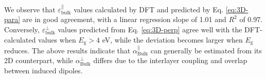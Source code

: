 \documentclass[journal=ancac3,manuscript=article,email=true,hyperref=true,keywords=false]{achemso}
\begin{document}
%
We observe that
$\varepsilon_{\mathrm{bulk}}^{\parallel}$ values calculated by DFT and
predicted by Eq. \ref{eq:3D-para} are in good agreement, with a linear
regression slope of 1.01 and $R^2$ of 0.97. Conversely,
$\varepsilon_{\mathrm{bulk}}^{\perp}$ values predicted from
Eq. \ref{eq:3D-perp} agree well with the DFT-calculated values when
$E_{\mathrm{g}}>4$ eV, while the deviation becomes larger when
$E_{\mathrm{g}}$ reduces. The above results indicate that
$\alpha^{\parallel}_{\mathrm{Bulk}}$ can generally be estimated from
its 2D counterpart, while $\alpha^{\perp}_{\mathrm{Bulk}}$ differs due
to the interlayer coupling and overlap between induced
dipoles\cite{Andersen_2015_dielec_vdWH,Laturia_2018}. 
\end{document}
